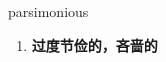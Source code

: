 
\begin{frame}
{\huge parsimonious}
\begin{center}
\begin{enumerate}\Large
  \item \textbf{过度节俭的，吝啬的}
\end{enumerate}
\end{center}
\end{frame}
